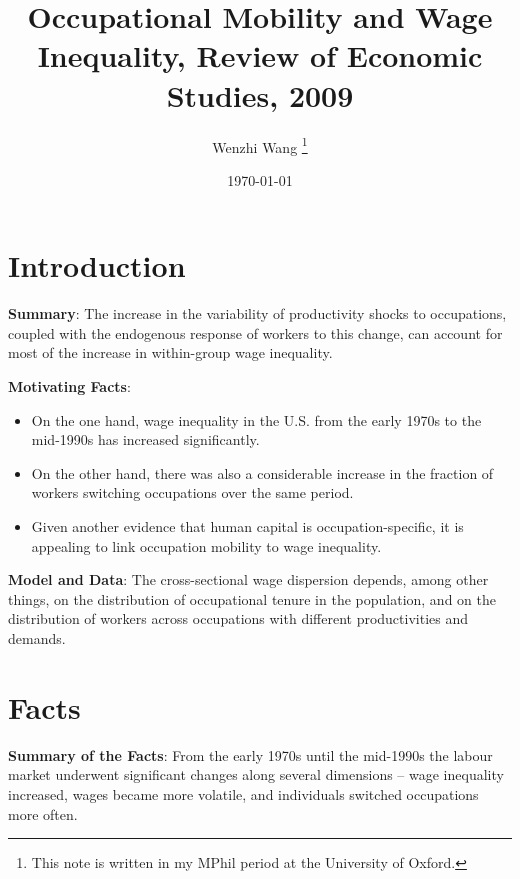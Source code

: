 \documentclass[12pt]{article}
\theoremstyle{definition}
\begin{document}

\title{\bf {Occupational Mobility and Wage Inequality, Review of Economic Studies, 2009}}
\author{Wenzhi Wang \thanks{This note is written in my MPhil period at the University of Oxford.} } 
\date{\today}
\maketitle

\citet{kambourovOccupationalMobilityWage2009}


\section{Introduction}

{\bf Summary}: The increase in the variability of productivity shocks to occupations, coupled with the endogenous response of workers to this change, can account for most of the increase in within-group wage inequality.

{\bf Motivating Facts}:  
\begin{itemize}[topsep=0pt, leftmargin=20pt, itemsep=0pt]
	\setlength{\parskip}{10pt} 
	\item On the one hand, wage inequality in the U.S. from the early 1970s to the mid-1990s has increased significantly.
	\item On the other hand, there was also a considerable increase in the fraction of workers switching occupations over the same period. 
	\item Given another evidence that human capital is occupation-specific, it is appealing to link occupation mobility to wage inequality.
\end{itemize}

{\bf Model and Data}: The cross-sectional wage dispersion depends, among other things, on the distribution of occupational tenure in the population, and on the distribution of workers across occupations with different productivities and demands. 

\section{Facts}
{\bf Summary of the Facts}: From the early 1970s until the mid-1990s the labour market underwent significant changes along several dimensions -- wage inequality increased, wages became more volatile, and individuals switched occupations more often.
\end{document}
